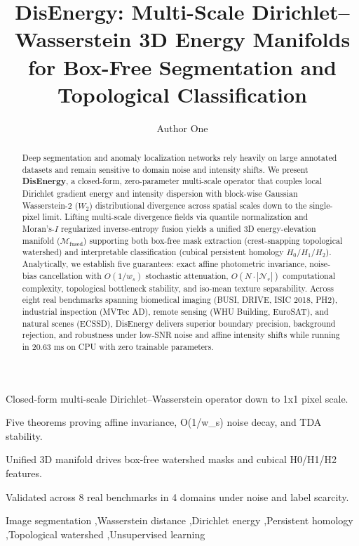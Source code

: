 \documentclass[preprint,12pt]{elsarticle}
\begin{document}
\begin{frontmatter}

\title{DisEnergy: Multi-Scale Dirichlet--Wasserstein 3D Energy Manifolds for Box-Free Segmentation and Topological Classification}

\author[1]{Author One}

\begin{abstract}
Deep segmentation and anomaly localization networks rely heavily on large annotated datasets and remain sensitive to domain noise and intensity shifts. We present \textbf{DisEnergy}, a closed-form, zero-parameter multi-scale operator that couples local Dirichlet gradient energy and intensity dispersion with block-wise Gaussian Wasserstein-2 ($W_2$) distributional divergence across spatial scales down to the single-pixel limit. Lifting multi-scale divergence fields via quantile normalization and Moran's-$I$ regularized inverse-entropy fusion yields a unified 3D energy-elevation manifold ($\mathcal{M}_{\mathrm{fused}}$) supporting both box-free mask extraction (crest-snapping topological watershed) and interpretable classification (cubical persistent homology $H_0/H_1/H_2$). Analytically, we establish five guarantees: exact affine photometric invariance, noise-bias cancellation with $O(1/w_s)$ stochastic attenuation, $O(N \cdot |\mathcal{N}_r|)$ computational complexity, topological bottleneck stability, and iso-mean texture separability. Across eight real benchmarks spanning biomedical imaging (BUSI, DRIVE, ISIC 2018, PH2), industrial inspection (MVTec AD), remote sensing (WHU Building, EuroSAT), and natural scenes (ECSSD), DisEnergy delivers superior boundary precision, background rejection, and robustness under low-SNR noise and affine intensity shifts while running in $20.63\text{ ms}$ on CPU with zero trainable parameters.
\end{abstract}

\begin{highlights}
\item Closed-form multi-scale Dirichlet--Wasserstein operator down to 1x1 pixel scale.
\item Five theorems proving affine invariance, O(1/w\_s) noise decay, and TDA stability.
\item Unified 3D manifold drives box-free watershed masks and cubical H0/H1/H2 features.
\item Validated across 8 real benchmarks in 4 domains under noise and label scarcity.
\end{highlights}

\begin{keyword}
Image segmentation \sep Wasserstein distance \sep Dirichlet energy \sep Persistent homology \sep Topological watershed \sep Unsupervised learning
\end{keyword}

\end{frontmatter}
\end{document}
